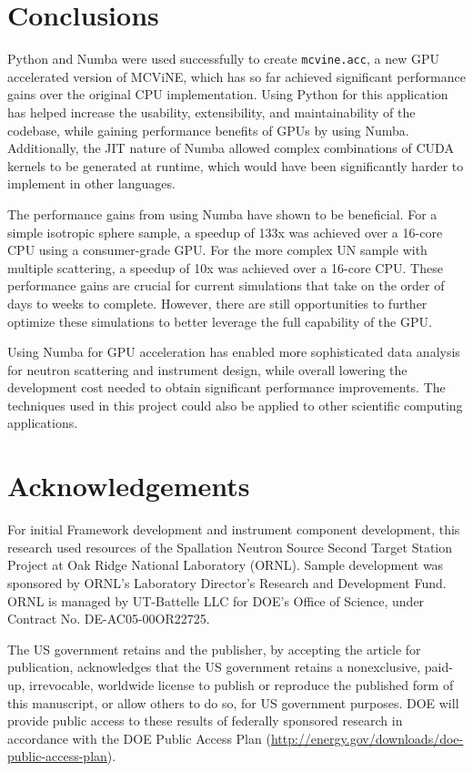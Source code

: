 \section{Conclusions}

Python and Numba were used successfully to create \texttt{mcvine.acc}, a new GPU accelerated version of MCViNE, which has so far achieved significant performance gains over the original CPU implementation. Using Python for this application has helped increase the usability, extensibility, and maintainability of the codebase, while gaining performance benefits of GPUs by using Numba. Additionally, the JIT nature of Numba allowed complex combinations of CUDA kernels to be generated at runtime, which would have been significantly harder to implement in other languages.

The performance gains from using Numba have shown to be beneficial. For a simple isotropic sphere sample, a speedup of 133x was achieved over a 16-core CPU using a consumer-grade GPU. For the more complex UN sample with multiple scattering, a speedup of 10x was achieved over a 16-core CPU. These performance gains are crucial for current simulations that take on the order of days to weeks to complete. However, there are still opportunities to further optimize these simulations to better leverage the full capability of the GPU.

Using Numba for GPU acceleration has enabled more sophisticated data analysis for neutron scattering and instrument design, while overall lowering the development cost needed to obtain significant performance improvements. The techniques used in this project could also be applied to other scientific computing applications.


\section{Acknowledgements}
For initial Framework development and instrument component development, this research used resources of the Spallation Neutron Source Second Target Station Project at Oak Ridge National Laboratory (ORNL). Sample development was sponsored by ORNL's Laboratory Director's Research and Development Fund. ORNL is managed by UT-Battelle LLC for DOE’s Office of Science, under Contract No. DE-AC05-00OR22725.

The US government retains and the publisher, by accepting the article for publication, acknowledges that the US government retains a nonexclusive, paid-up, irrevocable, worldwide license to publish or reproduce the published form of this manuscript, or allow others to do so, for US government purposes. DOE will provide public access to these results of federally sponsored research in accordance with the DOE Public Access Plan (\url{http://energy.gov/downloads/doe-public-access-plan}).
